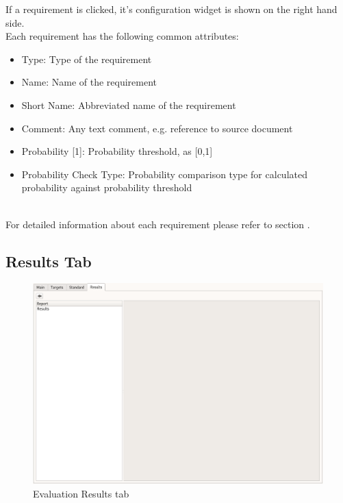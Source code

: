 
If a requirement is clicked, it's configuration widget is shown on the right hand side. \\

Each requirement has the following common attributes:
\begin{itemize}  
\item Type: Type of the requirement
\item Name: Name of the requirement
\item Short Name: Abbreviated name of the requirement
\item Comment: Any text comment, e.g. reference to source document
\item Probability [1]: Probability threshold, as [0,1]
\item Probability Check Type: Probability comparison type for calculated probability against probability threshold
\end{itemize}
\ \\

For detailed information about each requirement please refer to section .

\subsection{Results Tab}

\begin{figure}[H]
  \hspace*{-2cm}
    \includegraphics[width=18cm,frame]{figures/eval_results_empty.png}
  \caption{Evaluation Results tab}
\end{figure}

